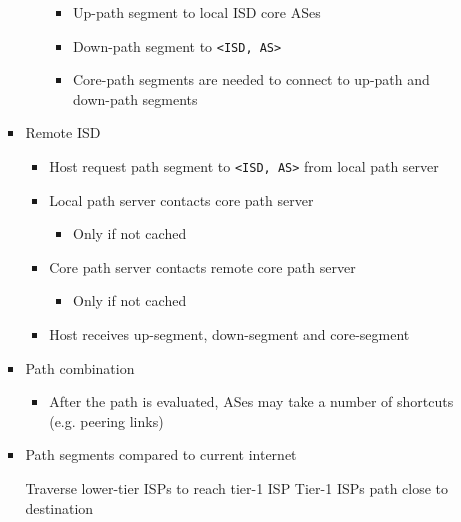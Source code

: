 \begin{itemize}
\begin{itemize}
\begin{itemize}
\begin{itemize}
\begin{itemize}
                                    \item Up-path segment to local ISD core ASes
                                    \item Down-path segment to \verb+<ISD, AS>+
                                    \item Core-path segments are needed to connect to up-path and down-path segments 
                                \end{itemize}
                        \end{itemize}
                    \item Remote ISD
                        \begin{itemize}
                            \item Host request path segment to \verb+<ISD, AS>+ from local path server
                            \item Local path server contacts core path server
                                \begin{itemize}
                                    \item Only if not cached
                                \end{itemize}
                            \item Core path server contacts remote core path server
                                \begin{itemize}
                                    \item Only if not cached
                                \end{itemize}
                            \item Host receives up-segment, down-segment and core-segment
                        \end{itemize}
                    \item Path combination
                        \begin{itemize}
                            \item After the path is evaluated, ASes may take a number of shortcuts (e.g. peering links)
                        \end{itemize}
                    \item Path segments compared to current internet
                        \begin{itemize}
                             Traverse lower-tier ISPs to reach tier-1 ISP
                             Tier-1 ISPs path close to destination

\end{itemize}
\end{itemize}
\end{itemize}
\end{itemize}
